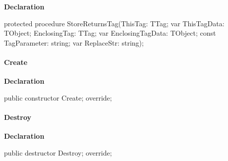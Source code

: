 \documentclass{report}
\newif\ifpdf
\begin{document}
\label{PasDoc_Items.TPasMethod-StoreReturnsTag}
\begin{list}{}{
\setlength{\itemindent}{0cm}
\setlength{\listparindent}{0cm}
\setlength{\leftmargin}{\evensidemargin}
\addtolength{\leftmargin}{\tmplength}
\settowidth{\labelsep}{X}
\addtolength{\leftmargin}{\labelsep}
\setlength{\labelwidth}{\tmplength}
}
\item[\textbf{Declaration}\hfill]
\ifpdf
\begin{flushleft}
\fi
\begin{ttfamily}
protected procedure StoreReturnsTag(ThisTag: TTag; var ThisTagData: TObject; EnclosingTag: TTag; var EnclosingTagData: TObject; const TagParameter: string; var ReplaceStr: string);\end{ttfamily}

\ifpdf
\end{flushleft}
\fi

\end{list}
\paragraph*{Create}\hspace*{\fill}

\label{PasDoc_Items.TPasMethod-Create}
\begin{list}{}{
\setlength{\itemindent}{0cm}
\setlength{\listparindent}{0cm}
\setlength{\leftmargin}{\evensidemargin}
\addtolength{\leftmargin}{\tmplength}
\settowidth{\labelsep}{X}
\addtolength{\leftmargin}{\labelsep}
\setlength{\labelwidth}{\tmplength}
}
\item[\textbf{Declaration}\hfill]
\ifpdf
\begin{flushleft}
\fi
\begin{ttfamily}
public constructor Create; override;\end{ttfamily}

\ifpdf
\end{flushleft}
\fi

\end{list}
\paragraph*{Destroy}\hspace*{\fill}

\label{PasDoc_Items.TPasMethod-Destroy}
\begin{list}{}{
\setlength{\itemindent}{0cm}
\setlength{\listparindent}{0cm}
\setlength{\leftmargin}{\evensidemargin}
\addtolength{\leftmargin}{\tmplength}
\settowidth{\labelsep}{X}
\addtolength{\leftmargin}{\labelsep}
\setlength{\labelwidth}{\tmplength}
}
\item[\textbf{Declaration}\hfill]
\ifpdf
\begin{flushleft}
\fi
\begin{ttfamily}
public destructor Destroy; override;\end{ttfamily}

\ifpdf
\end{flushleft}
\fi

\end{list}
\end{document}
